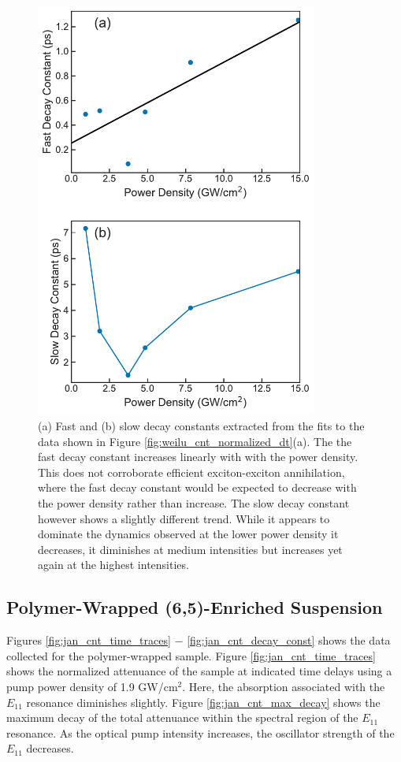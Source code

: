 \begin{figure}[ht]
	\centering
	\includegraphics[height=5.4in]{images/chapter_my_data/Weilu_CNT_Fast_Slow_Decay_Const}
	\caption{(a) Fast and (b) slow decay constants extracted from the fits to the data shown in Figure \ref{fig:weilu_cnt_normalized_dt}(a). The the fast decay constant increases linearly with with the power density. This does not corroborate efficient exciton-exciton annihilation, where the fast decay constant would be expected to decrease with the power density rather than increase. The slow decay constant however shows a slightly different trend. While it appears to dominate the dynamics observed at the lower power density it decreases, it diminishes at medium intensities but increases yet again at the highest intensities.}
	\label{fig:weilu_cnt_decay_const}
\end{figure}


\clearpage
\subsection{Polymer-Wrapped (6,5)-Enriched Suspension}

Figures \ref{fig:jan_cnt_time_traces} $-$ \ref{fig:jan_cnt_decay_const} shows the data collected for the polymer-wrapped sample. Figure \ref{fig:jan_cnt_time_traces} shows the normalized attenuance of the sample at indicated time delays using a pump power density of 1.9 GW/cm$^2$. Here, the absorption associated with the $E_{11}$ resonance diminishes slightly. Figure \ref{fig:jan_cnt_max_decay} shows the maximum decay of the total attenuance within the spectral region of the $E_{11}$ resonance. As the optical pump intensity increases, the oscillator strength of the $E_{11}$ decreases.

